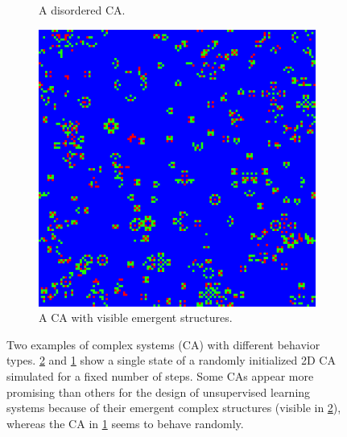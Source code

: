 \begin{enumerate}
\begin{figure}[htbp]
\begin{subfigure}[t]{.4\linewidth}
  \caption{A disordered \acl{CA}.}
 \label{fig:disordered_sys}
\end{subfigure}
\hspace{30pt}
\begin{subfigure}[t]{.4\linewidth}
  \centering
  \includegraphics[width=\linewidth]{figures/micro4.png}
  \caption{A \acl{CA} with visible emergent structures.}
  \label{fig:structured_sys}
\end{subfigure}
\caption{Two examples of complex systems (\acf{CA}) with different behavior
  types. \ref{fig:structured_sys} and \ref{fig:disordered_sys} show a single state 
  of a randomly initialized 2D \ac{CA} simulated for a fixed number of steps. Some \acp{CA} 
  appear more promising than others for the design of
  unsupervised learning systems because of their emergent complex structures
  (visible in \ref{fig:structured_sys}), whereas the \ac{CA} in
  \ref{fig:disordered_sys} seems to behave randomly.}
  \label{fig:comparison_ca}
\end{figure}


\end{enumerate}
